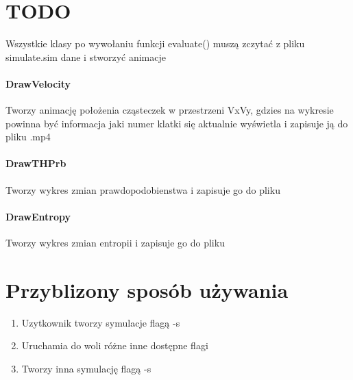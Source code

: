 \documentclass[]{article}
\begin{document}
\section{TODO}
	Wszystkie klasy po wywołaniu funkcji evaluate() muszą zczytać z pliku simulate.sim dane i stworzyć animacje
	
	\paragraph{DrawVelocity} Tworzy animację położenia cząsteczek w przestrzeni VxVy, gdzies na wykresie powinna być informacja jaki numer klatki się aktualnie wyświetla i zapisuje ją do pliku .mp4
	\paragraph{DrawTHPrb} Tworzy wykres zmian prawdopodobienstwa i zapisuje go do pliku
	\paragraph{DrawEntropy} Tworzy wykres zmian entropii i zapisuje go do pliku
	
\section{Przyblizony sposób używania}
	\begin{enumerate}
		\item Uzytkownik tworzy symulacje flagą -s
		\item Uruchamia do woli różne inne dostępne flagi
		\item Tworzy inna symulację flagą -s
	\end{enumerate}	
\end{document}
